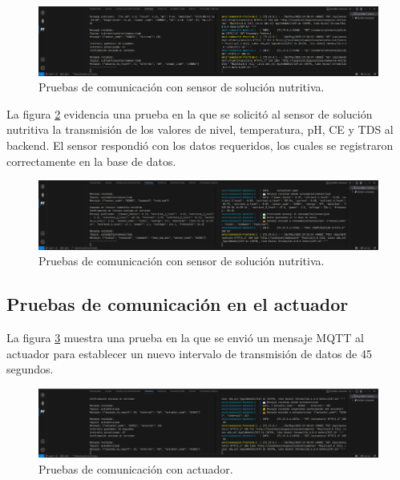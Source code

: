 \begin{figure}[H]
    \centering
    \includegraphics[width=\textwidth]{Images/57_prueba_mqtt_sensor_solucion_nutritiva_1.png}
    \caption[Pruebas de comunicación con sensor de solución nutritiva]{Pruebas de comunicación con sensor de solución nutritiva.}
    \label{fig:prueba_mqtt_sensor_solucion_nutritiva_1}
\end{figure}

La figura \ref{fig:prueba_mqtt_sensor_solucion_nutritiva_2} evidencia una
prueba en la que se solicitó al sensor de solución nutritiva la transmisión de
los valores de nivel, temperatura, pH, CE y TDS al backend. El sensor respondió
con los datos requeridos, los cuales se registraron correctamente en la base de
datos.

\begin{figure}[H]
    \centering
    \includegraphics[width=\textwidth]{Images/57_prueba_mqtt_sensor_solucion_nutritiva_2.png}
    \caption[Pruebas de comunicación con sensor de solución nutritiva]{Pruebas de comunicación con sensor de solución nutritiva.}
    \label{fig:prueba_mqtt_sensor_solucion_nutritiva_2}
\end{figure}

\subsection{Pruebas de comunicación en el actuador}

La figura \ref{fig:prueba_mqtt_actuador_1} muestra una prueba en la que se
envió un mensaje MQTT al actuador para establecer un nuevo intervalo de
transmisión de datos de 45 segundos.

\begin{figure}[H]
    \centering
    \includegraphics[width=\textwidth]{Images/58_prueba_mqtt_actuador_1.png}
    \caption[Pruebas de comunicación con actuador]{Pruebas de comunicación con actuador.}
    \label{fig:prueba_mqtt_actuador_1}
\end{figure}

